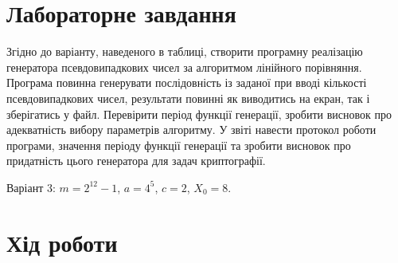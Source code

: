 \documentclass[oneside,14pt]{extarticle}
\begin{document}
\begin{normalsize}
    \section*{Лабораторне завдання}
    Згідно до варіанту, наведеного в таблиці, створити програмну реалізацію генератора псевдовипадкових чисел за алгоритмом лінійного порівняння. Програма повинна генерувати послідовність із заданої при вводі кількості псевдовипадкових чисел, результати повинні як виводитись на екран, так і зберігатись у файл. Перевірити період функції генерації, зробити висновок про адекватність вибору параметрів алгоритму. У звіті навести протокол роботи програми, значення періоду функції генерації та зробити висновок про придатність цього генератора для задач криптографії.

	Варіант 3: $m = 2^{12}-1$, $a = 4^5$, $c = 2$, $X_0=8$.

	\section*{Хід роботи}
	

\end{normalsize}
\end{document}

